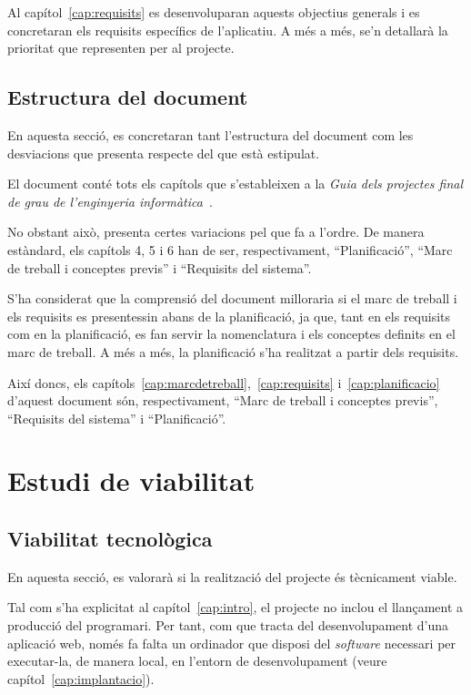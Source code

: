 \documentclass[a4paper,12pt]{ThesisStyle}
\begin{document}
Al capítol~\ref{cap:requisits} es desenvoluparan aquests objectius generals i es concretaran els requisits específics de l'aplicatiu. A més a més, se'n detallarà la prioritat que representen per al projecte.

\section{Estructura del document}
\label{sec:estructura_document}

En aquesta secció, es concretaran tant l'estructura del document com les desviacions que presenta respecte del que està estipulat.

El document conté tots els capítols que s'estableixen a la \textit{Guia dels projectes final de grau de l'enginyeria informàtica}~\cite{GuiaPFG}.

No obstant això, presenta certes variacions pel que fa a l'ordre. De manera estàndard, els capítols 4, 5 i 6 han de ser, respectivament, ``Planificació'', ``Marc de treball i conceptes previs'' i ``Requisits del sistema''.

S'ha considerat que la comprensió del document milloraria si el marc de treball i els requisits es presentessin abans de la planificació, ja que, tant en els requisits com en la planificació, es fan servir la nomenclatura i els conceptes definits en el marc de treball. A més a més, la planificació s'ha realitzat a partir dels requisits.

Així doncs, els capítols~\ref{cap:marcdetreball},~\ref{cap:requisits} i~\ref{cap:planificacio} d'aquest document són, respectivament, ``Marc de treball i conceptes previs'', ``Requisits del sistema'' i ``Planificació''.


\chapter{Estudi de viabilitat}
\label{cap:viabilitat}

\section{Viabilitat tecnològica}
\label{sec:viabilitat_tecnologica}

En aquesta secció, es valorarà si la realització del projecte és tècnicament viable.

Tal com s'ha explicitat al capítol~\ref{cap:intro}, el projecte no inclou el llançament a producció del programari. Per tant, com que tracta del desenvolupament d'una aplicació web, només fa falta un ordinador que disposi del \textit{software} necessari per executar-la, de manera local, en l'entorn de desenvolupament (veure capítol~\ref{cap:implantacio}).
\end{document}
